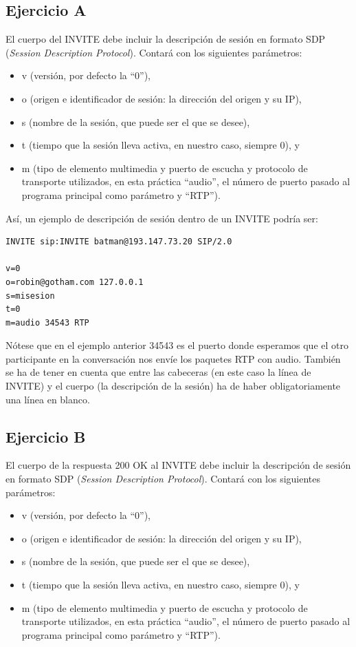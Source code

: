 \documentclass[a4paper,11pt]{article}
\begin{document}
\subsection*{Ejercicio A}

El cuerpo del INVITE debe incluir la descripción de sesión en formato SDP (\emph{Session Description Protocol}). Contará con los siguientes parámetros:

\begin{itemize}
  \item v (versión, por defecto la ``0''),
  \item o (origen e identificador de sesión: la dirección del origen y su IP),
  \item s (nombre de la sesión, que puede ser el que se desee),
  \item t (tiempo que la sesión lleva activa, en nuestro caso, siempre 0), y
  \item m (tipo de elemento multimedia y puerto de escucha y protocolo de transporte utilizados, en esta práctica ``audio'', el número de puerto pasado al programa principal como parámetro y ``RTP'').
\end{itemize}

Así, un ejemplo de descripción de sesión dentro de un INVITE podría ser:

\begin{verbatim}
INVITE sip:INVITE batman@193.147.73.20 SIP/2.0

v=0
o=robin@gotham.com 127.0.0.1
s=misesion
t=0
m=audio 34543 RTP
\end{verbatim}

Nótese que en el ejemplo anterior 34543 es el puerto donde esperamos que el otro participante en la conversación nos envíe los paquetes RTP con audio. También se ha de tener en cuenta que entre las cabeceras (en este caso la línea de INVITE) y el cuerpo (la descripción de la sesión) ha de haber obligatoriamente una línea en blanco.

\subsection*{Ejercicio B}

El cuerpo de la respuesta 200 OK al INVITE debe incluir la descripción de sesión en formato SDP (\emph{Session Description Protocol}). Contará con los siguientes parámetros:

\begin{itemize}
  \item v (versión, por defecto la ``0''),
  \item o (origen e identificador de sesión: la dirección del origen y su IP),
  \item s (nombre de la sesión, que puede ser el que se desee),
  \item t (tiempo que la sesión lleva activa, en nuestro caso, siempre 0), y
  \item m (tipo de elemento multimedia y puerto de escucha y protocolo de transporte utilizados, en esta práctica ``audio'', el número de puerto pasado al programa principal como parámetro y ``RTP'').
\end{itemize}
\end{document}
